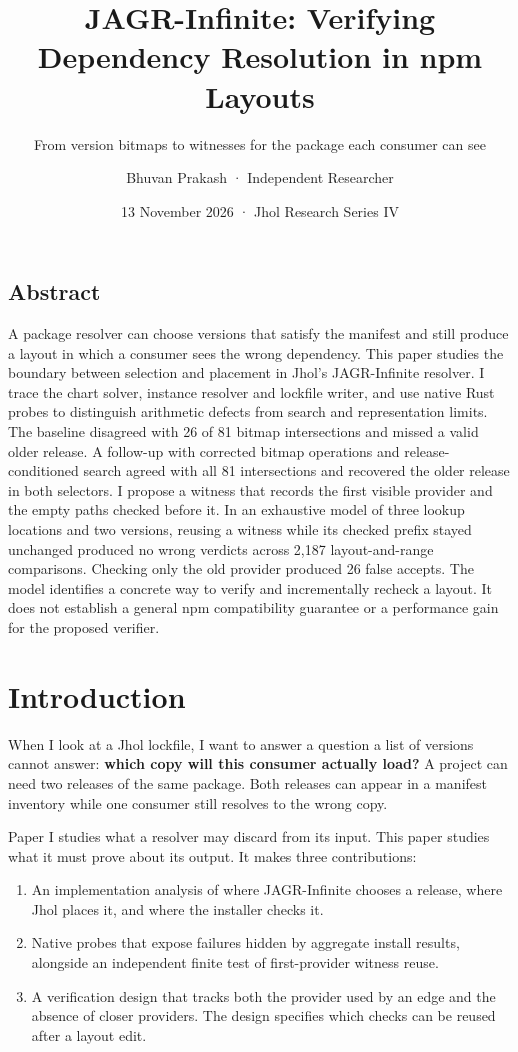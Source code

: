 \documentclass[
  11pt,
  letterpaper,
]{article}
\title{JAGR-Infinite: Verifying Dependency Resolution in npm Layouts}
\subtitle{From version bitmaps to witnesses for the package each
consumer can see}
\author{Bhuvan Prakash · Independent Researcher}
\date{13 November 2026 · Jhol Research Series IV}
\providecommand{\tightlist}{%
  \setlength{\itemsep}{0pt}\setlength{\parskip}{0pt}}
\begin{document}
\maketitle

\subsection*{Abstract}\label{abstract}

A package resolver can choose versions that satisfy the manifest and
still produce a layout in which a consumer sees the wrong dependency.
This paper studies the boundary between selection and placement in
Jhol's JAGR-Infinite resolver. I trace the chart solver, instance
resolver and lockfile writer, and use native Rust probes to distinguish
arithmetic defects from search and representation limits. The baseline
disagreed with 26 of 81 bitmap intersections and missed a valid older
release. A follow-up with corrected bitmap operations and
release-conditioned search agreed with all 81 intersections and
recovered the older release in both selectors. I propose a witness that
records the first visible provider and the empty paths checked before
it. In an exhaustive model of three lookup locations and two versions,
reusing a witness while its checked prefix stayed unchanged produced no
wrong verdicts across 2,187 layout-and-range comparisons. Checking only
the old provider produced 26 false accepts. The model identifies a
concrete way to verify and incrementally recheck a layout. It does not
establish a general npm compatibility guarantee or a performance gain
for the proposed verifier.

\section{Introduction}\label{introduction}

When I look at a Jhol lockfile, I want to answer a question a list of
versions cannot answer: \textbf{which copy will this consumer actually
load?} A project can need two releases of the same package. Both
releases can appear in a manifest inventory while one consumer still
resolves to the wrong copy.

Paper I studies what a resolver may discard from its input. This paper
studies what it must prove about its output. It makes three
contributions:

\begin{enumerate}
\def\labelenumi{\arabic{enumi}.}
\tightlist
\item
  An implementation analysis of where JAGR-Infinite chooses a release,
  where Jhol places it, and where the installer checks it.
\item
  Native probes that expose failures hidden by aggregate install
  results, alongside an independent finite test of first-provider
  witness reuse.
\item
  A verification design that tracks both the provider used by an edge
  and the absence of closer providers. The design specifies which checks
  can be reused after a layout edit.
\end{enumerate}
\end{document}
